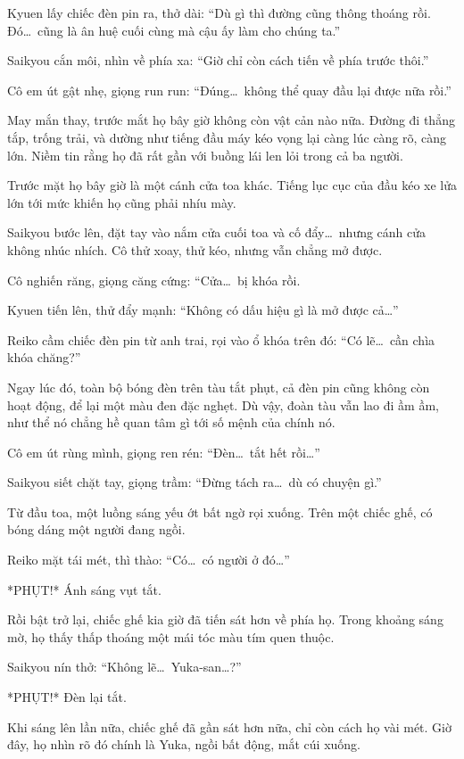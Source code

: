 \documentclass[../main.tex]{subfiles}
\begin{document}
Kyuen lấy chiếc đèn pin ra, thở dài: ``Dù gì thì đường cũng thông thoáng rồi. Đó\dots\ cũng là ân huệ cuối cùng mà cậu ấy làm cho chúng ta.''

Saikyou cắn môi, nhìn về phía xa: ``Giờ chỉ còn cách tiến về phía trước thôi.''

Cô em út gật nhẹ, giọng run run: ``Đúng\dots\ không thể quay đầu lại được nữa rồi.''

May mắn thay, trước mắt họ bây giờ không còn vật cản nào nữa. Đường đi thẳng tắp, trống trải, và dường như tiếng đầu máy kéo vọng lại càng lúc càng rõ, càng lớn. Niềm tin rằng họ đã rất gần với buồng lái len lỏi trong cả ba người.

Trước mặt họ bây giờ là một cánh cửa toa khác. Tiếng lục cục của đầu kéo xe lửa lớn tới mức khiến họ cũng phải nhíu mày.

Saikyou bước lên, đặt tay vào nắm cửa cuối toa và cố đẩy\dots\ nhưng cánh cửa không nhúc nhích. Cô thử xoay, thử kéo, nhưng vẫn chẳng mở được.

Cô nghiến răng, giọng căng cứng: ``Cửa\dots\ bị khóa rồi.

Kyuen tiến lên, thử đẩy mạnh: ``Không có dấu hiệu gì là mở được cả\dots''

Reiko cầm chiếc đèn pin từ anh trai, rọi vào ổ khóa trên đó: ``Có lẽ\dots\ cần chìa khóa chăng?''

Ngay lúc đó, toàn bộ bóng đèn trên tàu tắt phụt, cả đèn pin cũng không còn hoạt động, để lại một màu đen đặc nghẹt. Dù vậy, đoàn tàu vẫn lao đi ầm ầm, như thể nó chẳng hề quan tâm gì tới số mệnh của chính nó.

Cô em út rùng mình, giọng ren rén: ``Đèn\dots\ tắt hết rồi\dots''

Saikyou siết chặt tay, giọng trầm: ``Đừng tách ra\dots\ dù có chuyện gì.''

Từ đầu toa, một luồng sáng yếu ớt bất ngờ rọi xuống. Trên một chiếc ghế, có bóng dáng một người đang ngồi.

Reiko mặt tái mét, thì thào: ``Có\dots\ có người ở đó\dots''

*PHỤT!* Ánh sáng vụt tắt.

Rồi bật trở lại, chiếc ghế kia giờ đã tiến sát hơn về phía họ. Trong khoảng sáng mờ, họ thấy thấp thoáng một mái tóc màu tím quen thuộc.

Saikyou nín thở: ``Không lẽ\dots\ Yuka-san\dots?''

*PHỤT!* Đèn lại tắt.

Khi sáng lên lần nữa, chiếc ghế đã gần sát hơn nữa, chỉ còn cách họ vài mét. Giờ đây, họ nhìn rõ đó chính là Yuka, ngồi bất động, mắt cúi xuống.
\end{document}
